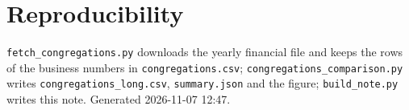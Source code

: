 \documentclass[11pt,a4paper]{article}
\begin{document}
\section*{Reproducibility}
\texttt{fetch\_congregations.py} downloads the yearly financial file and keeps the rows of the business numbers in \texttt{congregations.csv}; \texttt{congregations\_comparison.py} writes \texttt{congregations\_long.csv}, \texttt{summary.json} and the figure; \texttt{build\_note.py} writes this note. Generated 2026-11-07 12:47.
\end{document}
